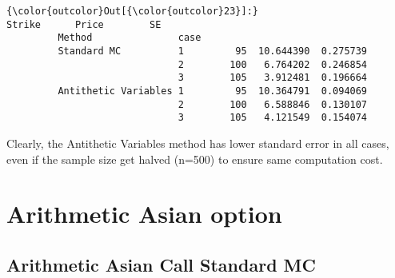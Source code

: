 \documentclass[11pt]{article}
\begin{document}
            \begin{Verbatim}[commandchars=\\\{\}]
{\color{outcolor}Out[{\color{outcolor}23}]:}                            Strike      Price        SE
         Method               case                             
         Standard MC          1         95  10.644390  0.275739
                              2        100   6.764202  0.246854
                              3        105   3.912481  0.196664
         Antithetic Variables 1         95  10.364791  0.094069
                              2        100   6.588846  0.130107
                              3        105   4.121549  0.154074
\end{Verbatim}
        
    Clearly, the Antithetic Variables method has lower standard error in all
cases, even if the sample size get halved (n=500) to ensure same
computation cost.

    \section{Arithmetic Asian option}\label{arithmetic-asian-option}

    \subsection{Arithmetic Asian Call Standard
MC}\label{arithmetic-asian-call-standard-mc}
\end{document}
